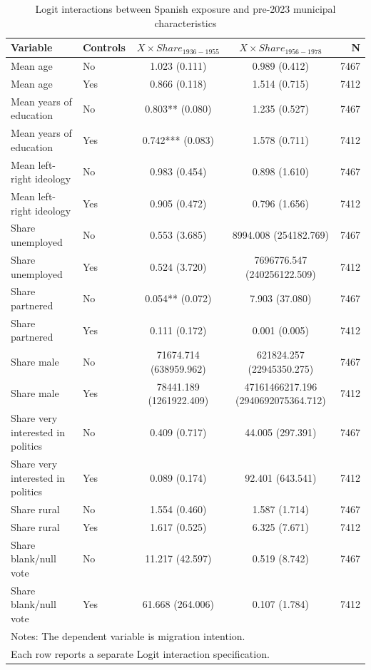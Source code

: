 \begin{table}[!htbp]
\centering
\caption{Logit interactions between Spanish exposure and pre-2023 municipal characteristics}
\label{tab:logit_share_interactions_key}
\small
\begin{tabular}{llccr}
\hline
Variable & Controls & $X \times Share_{1936-1955}$ & $X \times Share_{1956-1978}$ & N \\
\hline
Mean age & No & 1.023 (0.111) & 0.989 (0.412) & 7467 \\
Mean age & Yes & 0.866 (0.118) & 1.514 (0.715) & 7412 \\
Mean years of education & No & 0.803** (0.080) & 1.235 (0.527) & 7467 \\
Mean years of education & Yes & 0.742*** (0.083) & 1.578 (0.711) & 7412 \\
Mean left-right ideology & No & 0.983 (0.454) & 0.898 (1.610) & 7467 \\
Mean left-right ideology & Yes & 0.905 (0.472) & 0.796 (1.656) & 7412 \\
Share unemployed & No & 0.553 (3.685) & 8994.008 (254182.769) & 7467 \\
Share unemployed & Yes & 0.524 (3.720) & 7696776.547 (240256122.509) & 7412 \\
Share partnered & No & 0.054** (0.072) & 7.903 (37.080) & 7467 \\
Share partnered & Yes & 0.111 (0.172) & 0.001 (0.005) & 7412 \\
Share male & No & 71674.714 (638959.962) & 621824.257 (22945350.275) & 7467 \\
Share male & Yes & 78441.189 (1261922.409) & 47161466217.196 (2940692075364.712) & 7412 \\
Share very interested in politics & No & 0.409 (0.717) & 44.005 (297.391) & 7467 \\
Share very interested in politics & Yes & 0.089 (0.174) & 92.401 (643.541) & 7412 \\
Share rural & No & 1.554 (0.460) & 1.587 (1.714) & 7467 \\
Share rural & Yes & 1.617 (0.525) & 6.325 (7.671) & 7412 \\
Share blank/null vote & No & 11.217 (42.597) & 0.519 (8.742) & 7467 \\
Share blank/null vote & Yes & 61.668 (264.006) & 0.107 (1.784) & 7412 \\
\hline
\multicolumn{5}{l}{\footnotesize Notes: The dependent variable is migration intention.} \\
\multicolumn{5}{l}{\footnotesize Each row reports a separate Logit interaction specification.} \\

\end{tabular}
\end{table}

